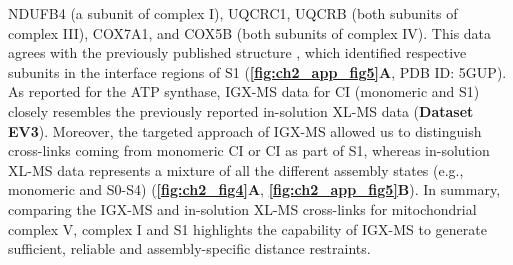 NDUFB4 (a subunit of complex I), UQCRC1, UQCRB (both subunits of complex III), COX7A1, and COX5B (both subunits of complex IV). This data agrees with the previously published structure \cite{Wu_2016}, which identified respective subunits in the interface regions of S1 (\textbf{\autoref{fig:ch2_app_fig5}A}, PDB ID: 5GUP). As reported for the ATP synthase, IGX-MS data for CI (monomeric and S1) closely resembles the previously reported in-solution XL-MS data \cite{Liu_2018} (\textbf{Dataset EV3}). Moreover, the targeted approach of IGX-MS allowed us to distinguish cross-links coming from monomeric CI or CI as part of S1, whereas in-solution XL-MS data represents a mixture of all the different assembly states (e.g., monomeric and S0-S4) (\textbf{\autoref{fig:ch2_fig4}A}, \textbf{\autoref{fig:ch2_app_fig5}B}).
In summary, comparing the IGX-MS and in-solution XL-MS cross-links for mitochondrial complex V, complex I and S1 highlights the capability of IGX-MS to generate sufficient, reliable and assembly-specific distance restraints.

